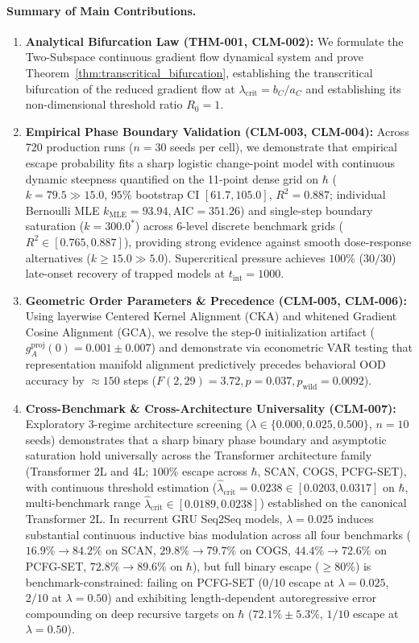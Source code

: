 \documentclass{article}
\theoremstyle{plain}
\theoremstyle{definition}
\begin{document}
\paragraph{Summary of Main Contributions.}
\begin{enumerate}[leftmargin=*,itemsep=2pt]
    \item \textbf{Analytical Bifurcation Law (THM-001, CLM-002):} We formulate the Two-Subspace continuous gradient flow dynamical system and prove Theorem~\ref{thm:transcritical_bifurcation}, establishing the transcritical bifurcation of the reduced gradient flow at $\lambda_{\text{crit}} = b_C / a_C$ and establishing its non-dimensional threshold ratio $R_0 = 1$.
    \item \textbf{Empirical Phase Boundary Validation (CLM-003, CLM-004):} Across 720 production runs ($n=30$ seeds per cell), we demonstrate that empirical escape probability fits a sharp logistic change-point model with continuous dynamic steepness quantified on the 11-point dense grid on $\hbar$ ($k = 79.5 \gg 15.0$, $95\%$ bootstrap CI $[61.7, 105.0]$, $R^2 = 0.887$; individual Bernoulli MLE $k_{\text{MLE}} = 93.94, \text{AIC} = 351.26$) and single-step boundary saturation ($k = 300.0^*$) across 6-level discrete benchmark grids ($R^2 \in [0.765, 0.887]$), providing strong evidence against smooth dose-response alternatives ($k \ge 15.0 \gg 5.0$). Supercritical pressure achieves $100\%$ ($30/30$) late-onset recovery of trapped models at $t_{\text{int}}=1000$.
    \item \textbf{Geometric Order Parameters \& Precedence (CLM-005, CLM-006):} Using layerwise Centered Kernel Alignment (CKA) and whitened Gradient Cosine Alignment (GCA), we resolve the step-0 initialization artifact ($g_A^{\text{proj}}(0) = 0.001 \pm 0.007$) and demonstrate via econometric VAR testing that representation manifold alignment predictively precedes behavioral OOD accuracy by $\approx 150$ steps ($F(2, 29) = 3.72, p = 0.037, p_{\text{wild}} = 0.0092$).
    \item \textbf{Cross-Benchmark \& Cross-Architecture Universality (CLM-007):} Exploratory 3-regime architecture screening ($\lambda \in \{0.000, 0.025, 0.500\}$, $n=10$ seeds) demonstrates that a sharp binary phase boundary and asymptotic saturation hold universally across the Transformer architecture family (Transformer 2L and 4L; $100\%$ escape across $\hbar$, SCAN, COGS, PCFG-SET), with continuous threshold estimation ($\hat{\lambda}_{\text{crit}} = 0.0238 \in [0.0203, 0.0317]$ on $\hbar$, multi-benchmark range $\hat{\lambda}_{\text{crit}} \in [0.0189, 0.0238]$) established on the canonical Transformer 2L. In recurrent GRU Seq2Seq models, $\lambda = 0.025$ induces substantial continuous inductive bias modulation across all four benchmarks ($16.9\% \to 84.2\%$ on SCAN, $29.8\% \to 79.7\%$ on COGS, $44.4\% \to 72.6\%$ on PCFG-SET, $72.8\% \to 89.6\%$ on $\hbar$), but full binary escape ($\ge 80\%$) is benchmark-constrained: failing on PCFG-SET ($0/10$ escape at $\lambda=0.025$, $2/10$ at $\lambda=0.50$) and exhibiting length-dependent autoregressive error compounding on deep recursive targets on $\hbar$ ($72.1\% \pm 5.3\%$, $1/10$ escape at $\lambda=0.50$).

\end{enumerate}
\end{document}
